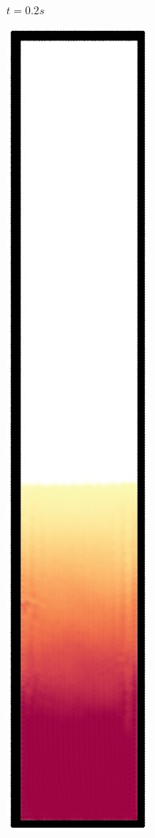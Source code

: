 \begin{figure}[h]
\begin{subfigure}[t]{0.09\textwidth}
    \caption{\small{$t=0.2s$}}
  \end{subfigure}%
  \begin{subfigure}[t]{0.09\textwidth}
    \includegraphics[width=\textwidth]{images/oscillate/030.jpg}

\end{subfigure}
\end{figure}
